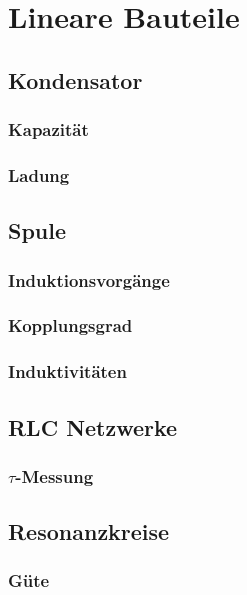 \chapter{Lineare Bauteile}

\section{Kondensator}

\subsection{Kapazität}

\subsection{Ladung}

\section{Spule}

\subsection{Induktionsvorgänge}

\subsection{Kopplungsgrad}

\subsection{Induktivitäten}



\section{RLC Netzwerke}

\subsection{$\tau$-Messung}



\section{Resonanzkreise}

\subsection{Güte}

